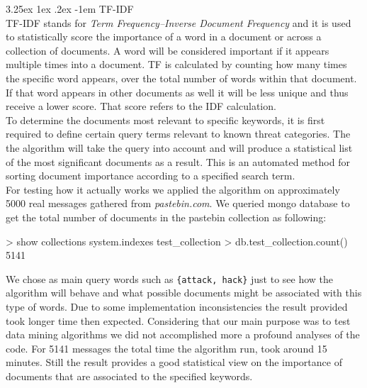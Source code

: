\documentclass[12pt]{article}
\makeatletter
\renewcommand\paragraph{\@startsection{paragraph}{5}{\z@}%
  {3.25ex \@plus1ex \@minus.2ex}%
  {-1em}%
  {\normalfont\normalsize\bfseries}}
\makeatother
\begin{document}
\paragraph{TF-IDF}
\hfill \break
\\
TF-IDF \cite{tf-idf} stands for \textit{Term Frequency–Inverse Document Frequency} and it is used to statistically score the importance of a word in a document or across a collection of documents. A word will be considered important if it appears multiple times into a document. TF is calculated by counting how many times the specific word appears, over the total number of words within that document. If that word appears in other documents as well it will be less unique and thus receive a lower score. That score refers to the IDF calculation. 
\hfill \break 
\\
To determine the documents most relevant to specific keywords, it is first required to define certain query terms relevant to known threat categories. The the algorithm will take the query into account and will produce a statistical list of the most significant documents as a result. This is an automated method for sorting document importance according to a specified search term. 
\hfill \break 
\\
For testing how it actually works we applied the algorithm on approximately 5000 real messages gathered from \textit{pastebin.com}. We queried mongo database to get the total number of documents in the pastebin collection as following:
\begin{spverbatim}
> show collections
system.indexes
test_collection
> db.test_collection.count()
5141
\end{spverbatim}
\hfill \break 
\parbox{\linewidth}{
We chose as main query words such as \texttt{\{attack, hack\}} just to see how the algorithm will behave and what possible documents might be associated with this type of words. Due to some implementation inconsistencies the result provided took longer time then expected. Considering that our main purpose was to test data mining algorithms we did not accomplished more a profound analyses of the code. For 5141 messages the total time the algorithm run, took around 15 minutes. Still the result provides a good statistical view on the importance of documents that are associated to the specified keywords.}
\hfill \break 
\end{document}
